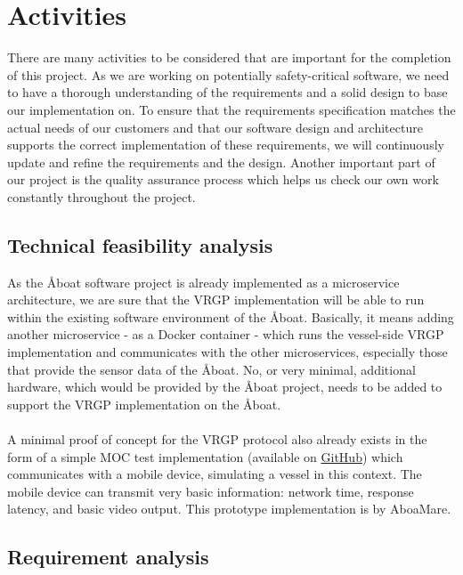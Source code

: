 \section{Activities}\label{sec:activities}

There are many activities to be considered that are important for the completion of this project. As we are working on potentially safety-critical software, we need to have a thorough understanding of the requirements and a solid design to base our implementation on. To ensure that the requirements specification matches the actual needs of our customers and that our software design and architecture supports the correct implementation of these requirements, we will continuously update and refine the requirements and the design. Another important part of our project is the quality assurance process which helps us check our own work constantly throughout the project.

\subsection{Technical feasibility analysis}\label{sec:feasibility}

As the Åboat software project is already implemented as a microservice architecture, we are sure that the VRGP implementation will be able to run within the existing software environment of the Åboat. Basically, it means adding another microservice - as a Docker container - which runs the vessel-side VRGP implementation and communicates with the other microservices, especially those that provide the sensor data of the Åboat. No, or very minimal, additional hardware, which would be provided by the Åboat project, needs to be added to support the VRGP implementation on the Åboat.
\\\\
A minimal proof of concept for the VRGP protocol also already exists in the form of a simple MOC test implementation (available on \href{https://github.com/RemoteBoatX/vrgp-docs/tree/main/moc-environment}{GitHub}) which communicates with a mobile device, simulating a vessel in this context. The mobile device can transmit very basic information: network time, response latency, and basic video output. This prototype implementation is by AboaMare.

\subsection{Requirement analysis}\label{sec:requirements}

